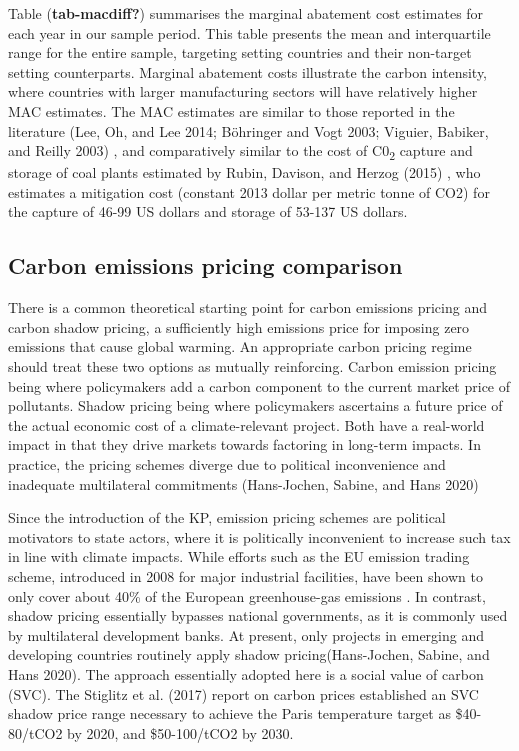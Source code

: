 \documentclass[
  letterpaper,
  DIV=11,
  numbers=noendperiod]{scrartcl}
\begin{document}
Table (\textbf{tab-macdiff?}) summarises the marginal abatement cost
estimates for each year in our sample period. This table presents the
mean and interquartile range for the entire sample, targeting setting
countries and their non-target setting counterparts. Marginal abatement
costs illustrate the carbon intensity, where countries with larger
manufacturing sectors will have relatively higher MAC estimates. The MAC
estimates are similar to those reported in the literature (Lee, Oh, and
Lee 2014; Böhringer and Vogt 2003; Viguier, Babiker, and Reilly 2003) ,
and comparatively similar to the cost of C0\textsubscript{2} capture and
storage of coal plants estimated by Rubin, Davison, and Herzog (2015) ,
who estimates a mitigation cost (constant 2013 dollar per metric tonne
of CO2) for the capture of 46-99 US dollars and storage of 53-137 US
dollars.

\hypertarget{carbon-emissions-pricing-comparison}{%
\subsection{Carbon emissions pricing
comparison}\label{carbon-emissions-pricing-comparison}}

There is a common theoretical starting point for carbon emissions
pricing and carbon shadow pricing, a sufficiently high emissions price
for imposing zero emissions that cause global warming. An appropriate
carbon pricing regime should treat these two options as mutually
reinforcing. Carbon emission pricing being where policymakers add a
carbon component to the current market price of pollutants. Shadow
pricing being where policymakers ascertains a future price of the actual
economic cost of a climate-relevant project. Both have a real-world
impact in that they drive markets towards factoring in long-term
impacts. In practice, the pricing schemes diverge due to political
inconvenience and inadequate multilateral commitments (Hans-Jochen,
Sabine, and Hans 2020)

Since the introduction of the KP, emission pricing schemes are political
motivators to state actors, where it is politically inconvenient to
increase such tax in line with climate impacts. While efforts such as
the EU emission trading scheme, introduced in 2008 for major industrial
facilities, have been shown to only cover about 40\% of the European
greenhouse-gas emissions . In contrast, shadow pricing essentially
bypasses national governments, as it is commonly used by multilateral
development banks. At present, only projects in emerging and developing
countries routinely apply shadow pricing(Hans-Jochen, Sabine, and Hans
2020). The approach essentially adopted here is a social value of carbon
(SVC). The Stiglitz et al. (2017) report on carbon prices established an
SVC shadow price range necessary to achieve the Paris temperature target
as \$40-80/tCO2 by 2020, and \$50-100/tCO2 by 2030.
\end{document}
